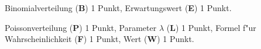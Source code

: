 \begin{bewertung}
\begin{teilaufgaben}
\item
Binomialverteilung ({\bf B}) 1 Punkt, Erwartungswert ({\bf E}) 1 Punkt.
\item
Poissonverteilung ({\bf P}) 1 Punkt, 
Parameter $\lambda$ ({\bf L}) 1 Punkt,
Formel f"ur Wahrscheinlichkeit ({\bf F}) 1 Punkt,
Wert ({\bf W}) 1 Punkt.
\end{teilaufgaben}
\end{bewertung}

